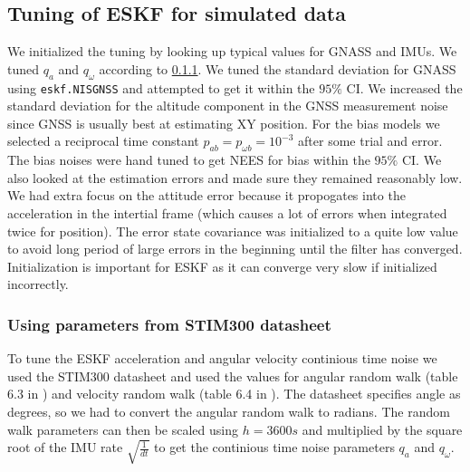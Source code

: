 \subsection{Tuning of ESKF for simulated data}
We initialized the tuning by looking up typical values for GNASS and IMUs. We tuned $q_a$ and $q_\omega$ according to \cref{sec:using_datasheet}. We tuned the standard deviation for GNASS using \texttt{eskf.NISGNSS} and attempted to get it within the $95\%$ CI. We increased the standard deviation for the altitude component in the GNSS measurement noise since GNSS is usually best at estimating XY position. For the bias models we selected a reciprocal time constant $p_{ab} = p_{\omega b} = 10^{-3}$ after some trial and error. The bias noises were hand tuned to get NEES for bias within the $95\%$ CI. We also looked at the estimation errors and made sure they remained reasonably low. We had extra focus on the attitude error because it propogates into the acceleration in the intertial frame (which causes a lot of errors when integrated twice for position). The error state covariance was initialized to a quite low value to avoid long period of large errors in the beginning until the filter has converged. Initialization is important for ESKF as it can  converge very slow if initialized incorrectly.

\subsubsection{Using parameters from STIM300 datasheet}\label{sec:using_datasheet}
To tune the ESKF acceleration and angular velocity continious time noise we used the STIM300 datasheet \cite{stim300} and used the values for angular random walk (table 6.3 in \cite{stim300}) and velocity random walk (table 6.4 in \cite{stim300}). 
The datasheet specifies angle as degrees, so we had to convert the angular random walk to radians.
The random walk parameters can then be scaled using $h=3600s$ and multiplied by the square root of the IMU rate $\sqrt{\frac{1}{dt}}$ to get the continious time noise parameters $q_a$ and $q_\omega$.


